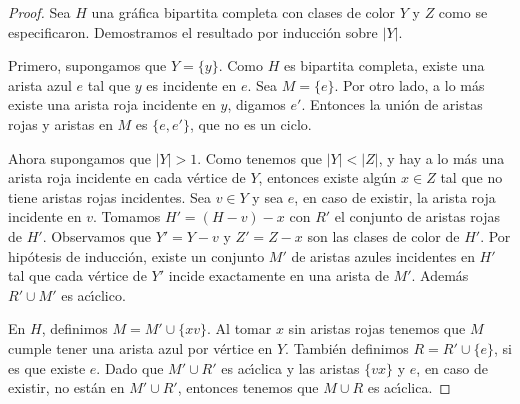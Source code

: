 \begin{proof}
    Sea $H$ una gr\'afica bipartita completa con clases de color $Y$ y $Z$ como
    se especificaron. Demostramos el resultado por inducci\'on sobre $|Y|$. 

    Primero, supongamos que $Y=\{y\}$. Como $H$ es bipartita completa, existe
    una arista azul $e$ tal que $y$ es incidente en $e$.   Sea $M = \{ e \}$.
    Por otro lado, a lo m\'as existe una arista roja incidente en $y$, digamos
    $e'$. Entonces la uni\'on de aristas rojas y aristas en $M$ es $\{e, e'\}$,
    que no es un ciclo.

    Ahora supongamos que $|Y|>1$. Como tenemos que $|Y|<|Z|$, y hay a lo m\'as
    una arista roja incidente en cada v\'ertice de $Y$, entonces existe alg\'un
    $x \in Z$ tal que no tiene aristas rojas incidentes. Sea $v \in Y$ y sea
    $e$, en caso de existir, la arista roja incidente en $v$. Tomamos $H'=
    (H-v)-x$ con $R'$ el conjunto de aristas rojas de $H'$. Observamos que $Y' =
    Y- v$ y $Z'= Z- x$ son las clases de color de $H'$. Por hip\'otesis de
    inducci\'on, existe un conjunto $M'$ de aristas azules incidentes en $H'$
    tal que cada v\'ertice de $Y'$ incide exactamente en una arista de $M'$.
    Adem\'as $R'\cup M'$ es ac\'\i{}clico.
    
    En $H$, definimos $M = M'\cup \{xv\}$. Al tomar $x$ sin aristas rojas
    tenemos que $M$ cumple tener una arista azul por v\'ertice en $Y$. Tambi\'en
    definimos $R= R'\cup \{ e \}$, si es que existe $e$.  Dado que  $M'\cup R'$
    es ac\'\i{}clica y las aristas $\{vx\}$ y $e$, en caso de existir, no
    est\'an en $M'\cup R'$, entonces tenemos que $M \cup R$ es ac\'\i{}clica.
\end{proof}

